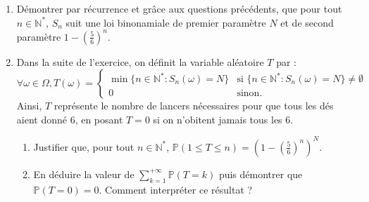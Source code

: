 \documentclass{article}
\begin{document}
\begin{paracol}{2}
{\begin{enumerate}
\begin{enumerate}
        \textit{Indication : on pourra appliquer la formule des probabilités totales en remarquant que $(\{S_n = i\})_{i \in \llbracket 0,N \rrbracket}$ est un système complet d'événements.}
        
        \item Vérifier que pour tout $k \in \llbracket 0,N \rrbracket$, pour tout $i \in \llbracket 0,k \rrbracket$ :
        \[
            \binom{N}{i} \binom{N-i}{k-i}
            =
            \binom{N}{k} \binom{k}{i}.
        \]
        \item Obtenir alors que, pour tout $k \in \llbracket 0,N \rrbracket$ :
        \[
            \mathbb{P}(S_{n+1} = k)
            =
            \binom{N}{k}
            \left(\frac{1+5p_n}{6}\right)^k
            \left(1 - \frac{1+5p_n}{6}\right)^{N-k}.
            \]
    \end{enumerate}
    \item Démontrer par récurrence et grâce aux questions précédents, que pour tout $n \in \mathbb{N}^*$, $S_n$ suit une loi binonamiale de premier paramètre $N$ et de second paramètre $1 - (\frac{5}{6})^n$.
    \item Dans la suite de l'exercice, on définit la variable aléatoire $T$ par :
    \[
        \forall \omega \in \Omega, T(\omega) = \begin{cases}
        \min\{n \in \mathbb{N}^* : S_n(\omega) = N\} & \text{si } \{n \in \mathbb{N}^* : S_n(\omega) = N\} \neq \emptyset \\
        0 & \text{sinon}.
        \end{cases}
    \]
    Ainsi, $T$ représente le nombre de lancers nécessaires pour que tous les dés aient donné 6, en posant $T = 0$ si on n'obitent jamais tous les 6.
    \begin{enumerate}
        \item Justifier que, pour tout $n \in \mathbb{N}^*$, $\mathbb{P}(1 \leq T \leq n) = (1 - (\frac{5}{6})^n)^N$.
        \item En déduire la valeur de $\sum_{k=1}^{+\infty} \mathbb{P}(T = k)$ puis démontrer que $\mathbb{P}  (T = 0) = 0$. Comment interpréter ce résultat ?
    \end{enumerate}
\end{enumerate}
}
\switchcolumn
{}
\end{paracol}
\end{document}
